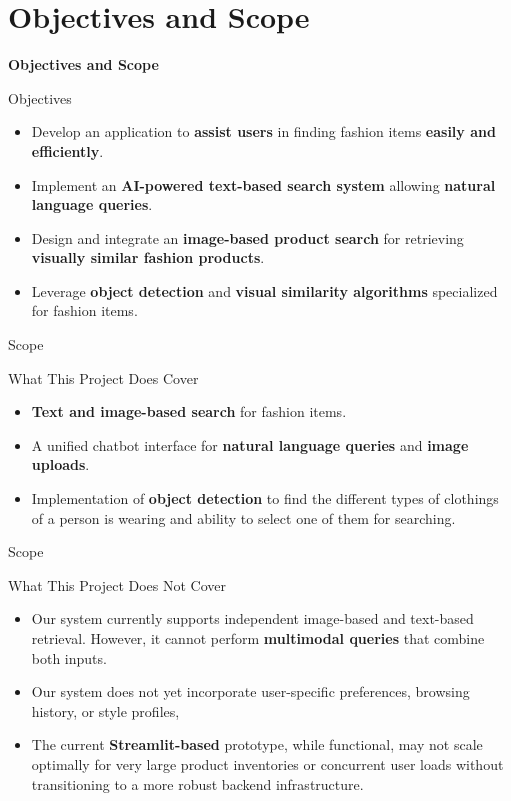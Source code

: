 \section{Objectives and Scope}
\begin{frame}{}
  \Huge
  \centering
  \textbf{Objectives and Scope}
  \normalsize
\end{frame}



\begin{frame}{Objectives}

\begin{itemize}
    \item<1-> Develop an application to \textbf{assist users} in finding fashion items \textbf{easily and efficiently}.
    \item<2-> Implement an \textbf{AI-powered text-based search system} allowing \textbf{natural language queries}.
    \item<3-> Design and integrate an \textbf{image-based product search} for retrieving \textbf{visually similar fashion products}.
    \item<4-> Leverage \textbf{object detection} and \textbf{visual similarity algorithms} specialized for fashion items.
\end{itemize}

\end{frame}


\begin{frame}{Scope}
  \begin{block}{What This Project Does Cover}
  \begin{itemize}
	\setlength\itemsep{0.75em}
    \item<1-> \textbf{Text and image-based search} for fashion items.
    \item<2-> A unified chatbot interface for \textbf{natural language queries} and \textbf{image uploads}.
    \item<3-> Implementation of \textbf{object detection} to find the different types of clothings of a person is wearing and ability to select one of them for searching.
  \end{itemize}
  \end{block}
\end{frame}

\begin{frame}{Scope}
  \begin{block}{What This Project Does Not Cover}
    \begin{itemize}
      \item<1-> Our system currently supports independent image-based and text-based retrieval. However, it cannot perform \textbf{multimodal queries} that combine both inputs.
      \item<2-> Our system does not yet incorporate user-specific preferences, browsing history, or style profiles,
      \item<3-> The current \textbf{Streamlit-based} prototype, while functional, may not scale optimally for very large product inventories or concurrent user loads without transitioning to a more robust backend infrastructure.
    \end{itemize}
  \end{block}
\end{frame}